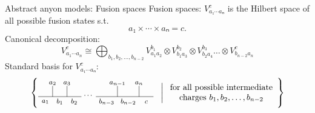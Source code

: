 \documentclass{beamer}
\begin{document}
\begin{frame}{Abstract anyon models: Fusion spaces}
  Fusion spaces: $V_{a₁⋯aₙ}^c$ is the Hilbert space of all possible fusion states s.t.
  \[ a₁ × ⋯ × aₙ = c. \]
  \pause
  Canonical decomposition:
  \begin{equation*}
    V_{a_1 \cdots a_n}^c \cong \bigoplus_{b_1,b_2,\ldots,b_{n-2}} V_{a_1a_2}^{b_1} \otimes V_{b_1 a_3}^{b_2} \otimes V_{b_2 a_4}^{b_3} \ldots \otimes V_{b_{n-2} a_n}^c
  \end{equation*}
  \pause
  Standard basis for $V_{a₁⋯aₙ}^c$:
  \begin{equation*}
    \left\{
    \begin{tikzpicture}[scale=0.3,font=\footnotesize,anchor=mid,baseline={([yshift=-.5ex]current bounding box.center)}]
      \node at (0, -0.6) {$a_1$};
      \node at (1, 2) {$a_2$};
      \node at (3, 2) {$a_3$};
      \node at (10, 2) {$a_{n-1}$};
      \node at (13, 2) {$a_n$};
      \draw (1, 0) to (1, 1.5);
      \draw (3, 0) to (3, 1.5);
      \draw (10, 0) to (10, 1.5);
      \draw (13, 0) to (13, 1.5);
      \draw (-1, 0) to (5, 0);
      \draw (7, 0) to (15, 0);
      \node at (2, -0.7) {$b_1$};
      \node at (4, -0.7) {$b_2$};
      \node at (6, 0.2) {$\cdots$};
      \node at (8.5, -0.7) {$b_{n-3}$};
      \node at (11.5, -0.7) {$b_{n-2}$};
      \node at (14, -0.7) {$c$};
    \end{tikzpicture}
    \;\;\;\bigg|\; \begin{array}{c}\text{for all possible intermediate} \\ \text{charges $b_1, b_2, \ldots, b_{n-2}$}\end{array}
    \right\}
  \end{equation*}
\end{frame}
\end{document}
